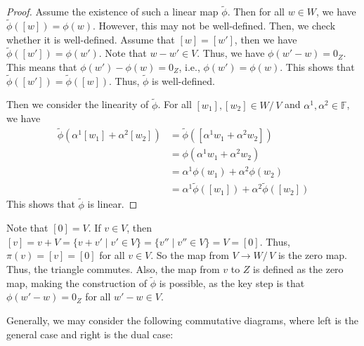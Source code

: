 \documentclass[
	11pt, %
	fleqn, %
	a4paper, %
]{LegrandOrangeBook}
\renewcommand{\ker}[1]{\mathsf{Ker}(#1)} %
\renewcommand{\Im}[1]{\mathsf{Im}(#1)} %
\newcommand{\quotient}[2]{#1/\, #2} %
\newcommand{\F}{\mathbb{F}} %
\newcommand{\coker}[1]{\mathsf{Coker}(#1)} %
\newcommand{\coim}[1]{\mathsf{Coim}(#1)} %
\begin{document}
\begin{proof}
    Assume the existence of such a linear map $\tilde{\phi}$. Then for all $w \in W$, we have $\tilde{\phi}([w]) = \phi(w)$. However, this may not be well-defined. Then, we check whether it is well-defined. Assume that $[w] = [w']$, then we have $\tilde{\phi}([w']) = \phi(w')$. Note that $w - w' \in V$. Thus, we have $\phi(w' - w) = 0_Z$. This means that $\phi(w') - \phi(w) = 0_Z$, i.e., $\phi(w') = \phi(w)$. This shows that $\tilde{\phi}([w']) = \tilde{\phi}([w])$. Thus, $\tilde{\phi}$ is well-defined.

    Then we consider the linearity of $\tilde{\phi}$. For all $[w_1], [w_2] \in \quotient{W}{V}$ and $\alpha^1, \alpha^2 \in \F$, we have
    \[
        \begin{split}
            \tilde{\phi}(\alpha^1 [w_1] + \alpha^2 [w_2]) &= \tilde{\phi}([\alpha^1 w_1 + \alpha^2 w_2]) \\
            &= \phi(\alpha^1 w_1 + \alpha^2 w_2) \\
            &= \alpha^1 \phi(w_1) + \alpha^2 \phi(w_2) \\
            &= \alpha^1 \tilde{\phi}([w_1]) + \alpha^2 \tilde{\phi}([w_2])
        \end{split}
    \]
    This shows that $\tilde{\phi}$ is linear.
\end{proof}

\begin{remark}
    Note that $[0] = V$. If $v \in V$, then $[v] = v + V = \{v + v' \mid v' \in V\} = \{v'' \mid v'' \in V\} = V = [0]$. Thus, $\pi(v) = [v] = [0]$ for all $v \in V$. So the map from $V \to \quotient{W}{V}$ is the zero map. Thus, the triangle commutes. Also, the map from $v$ to $Z$ is defined as the zero map, making the construction of $\tilde{\phi}$ is possible, as the key step is that $\phi(w' - w) = 0_Z$ for all $w' - w \in V$.
\end{remark}

Generally, we may consider the following commutative diagrams, where left is the general case and right is the dual case:

\begin{center}
\end{center}
\end{document}
